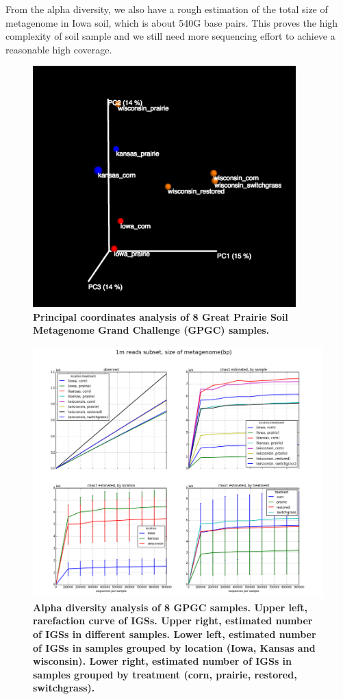  From the alpha diversity, we also have a rough estimation of the  total 
 size of metagenome in Iowa soil, which is about 540G base pairs. This 
 proves the high complexity of soil sample and we still need more sequencing 
 effort to achieve a reasonable high coverage.
 

\begin{figure}[!ht]
 \centerline{\includegraphics[width=4in]{./figures/GPGC_old_subset1M.png}}
\caption{\bf Principal coordinates analysis of 8 Great Prairie Soil Metagenome
Grand Challenge (GPGC) samples.}
\label{fig:GPGC_beta}
\end{figure}



\begin{figure}[!ht]
 \centerline{\includegraphics[width=7in]{./figures/GPGC_1m_old.png}}
\caption{\bf Alpha diversity analysis of 8 GPGC samples. Upper left,
rarefaction curve of IGSs. Upper right, estimated number of IGSs in different
samples. Lower left, estimated number of IGSs in samples grouped by
location (Iowa, Kansas and wisconsin). Lower right, estimated number of IGSs in
samples grouped by treatment (corn, prairie, restored, switchgrass).}
\label{fig:GPGC-alpha}
\end{figure}



